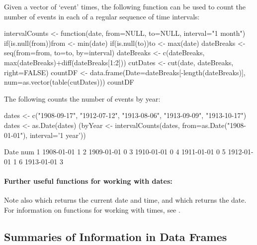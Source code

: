Given a vector of `event' times, the following function can be used to
count the number of events in each of a regular sequence of time
intervals:
\begin{fullwidth}

\begin{Schunk}
\begin{Sinput}
intervalCounts <- function(date, from=NULL, to=NULL, interval="1 month"){
  if(is.null(from))from <- min(date)
  if(is.null(to))to <- max(date)
  dateBreaks <- seq(from=from, to=to, by=interval)
  dateBreaks <- c(dateBreaks, max(dateBreaks)+diff(dateBreaks[1:2]))
  cutDates <- cut(date, dateBreaks, right=FALSE)
  countDF <- data.frame(Date=dateBreaks[-length(dateBreaks)],
                        num=as.vector(table(cutDates)))
  countDF
}
\end{Sinput}
\end{Schunk}

\end{fullwidth}

The following counts the number of events by year:
\begin{fullwidth}
\small

\begin{Schunk}
\begin{Sinput}
dates <- c("1908-09-17", "1912-07-12", "1913-08-06", "1913-09-09", "1913-10-17")
dates <- as.Date(dates)
(byYear <- intervalCounts(dates, from=as.Date("1908-01-01"), interval='1 year'))
\end{Sinput}
\begin{Soutput}
        Date num
1 1908-01-01   1
2 1909-01-01   0
3 1910-01-01   0
4 1911-01-01   0
5 1912-01-01   1
6 1913-01-01   3
\end{Soutput}
\end{Schunk}

\end{fullwidth}

\paragraph{Further useful functions for working with dates:}
Note
 also 
which returns the current date and time, and  which
returns the date.  For information on functions for working with
times, see .

\subsection{Summaries of Information in Data Frames}

